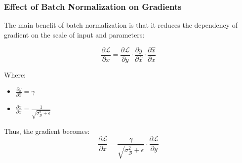 \documentclass[serif, aspectratio=169]{beamer}
\begin{document}
\begin{frame}
    \frametitle{Effect of Batch Normalization on Gradients}

    The main benefit of batch normalization is that it reduces the dependency of gradient on the scale of input and parameters:

    \begin{equation}
        \frac{\partial \mathcal{L}}{\partial x} = \frac{\partial \mathcal{L}}{\partial y} \cdot \frac{\partial y}{\partial \hat{x}} \cdot \frac{\partial \hat{x}}{\partial x}
    \end{equation}

    Where:
    \begin{itemize}
        \item \centering \(\frac{\partial y}{\partial \hat{x}} = \gamma\) \\
        \item \(\frac{\partial \hat{x}}{\partial x} = \frac{1}{\sqrt{\sigma_{\mathcal{B}}^2 + \epsilon}}\)
    \end{itemize}

    Thus, the gradient becomes:
    \begin{equation}
        \frac{\partial \mathcal{L}}{\partial x} = \frac{\gamma}{\sqrt{\sigma_{\mathcal{B}}^2 + \epsilon}} \cdot \frac{\partial \mathcal{L}}{\partial y}
    \end{equation}
\end{frame}





%
\end{document}

